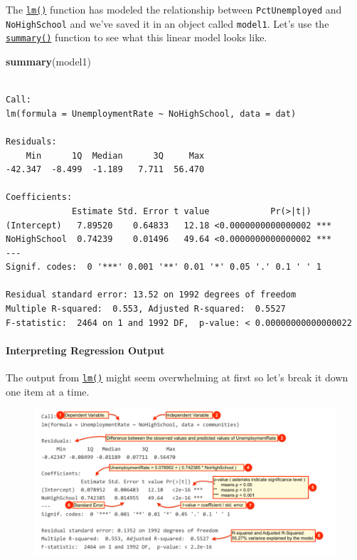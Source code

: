 \documentclass[]{article}
\newenvironment{Shaded}{\begin{snugshade}}{\end{snugshade}}
\newcommand{\KeywordTok}[1]{\textcolor[rgb]{0.13,0.29,0.53}{\textbf{#1}}}
\newcommand{\NormalTok}[1]{#1}
\let\oldparagraph\paragraph
\renewcommand{\paragraph}[1]{\oldparagraph{#1}\mbox{}}
\theoremstyle{definition}
\theoremstyle{definition}
\theoremstyle{definition}
\theoremstyle{remark}
\begin{document}
The \href{http://bit.ly/R_lm}{\texttt{lm()}} function has modeled the
relationship between \texttt{PctUnemployed} and \texttt{NoHighSchool}
and we've saved it in an object called \texttt{model1}. Let's use the
\href{http://bit.ly/R_summary}{\texttt{summary()}} function to see what
this linear model looks like.

\begin{Shaded}
\begin{Highlighting}[]
\KeywordTok{summary}\NormalTok{(model1)}
\end{Highlighting}
\end{Shaded}

\begin{verbatim}

Call:
lm(formula = UnemploymentRate ~ NoHighSchool, data = dat)

Residuals:
    Min      1Q  Median      3Q     Max 
-42.347  -8.499  -1.189   7.711  56.470 

Coefficients:
             Estimate Std. Error t value            Pr(>|t|)    
(Intercept)   7.89520    0.64833   12.18 <0.0000000000000002 ***
NoHighSchool  0.74239    0.01496   49.64 <0.0000000000000002 ***
---
Signif. codes:  0 '***' 0.001 '**' 0.01 '*' 0.05 '.' 0.1 ' ' 1

Residual standard error: 13.52 on 1992 degrees of freedom
Multiple R-squared:  0.553, Adjusted R-squared:  0.5527 
F-statistic:  2464 on 1 and 1992 DF,  p-value: < 0.00000000000000022
\end{verbatim}

\paragraph{Interpreting Regression
Output}\label{interpreting-regression-output}

The output from \href{http://bit.ly/R_lm}{\texttt{lm()}} might seem
overwhelming at first so let's break it down one item at a time.

\begin{figure}
\centering
\includegraphics{./img/lm.png}
\caption{}
\end{figure}
\end{document}
